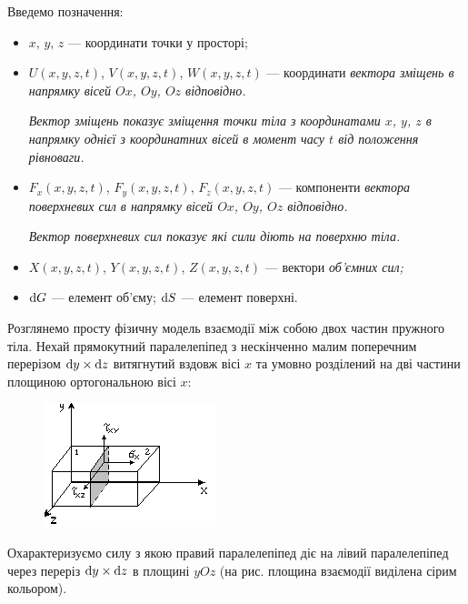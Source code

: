 Введемо позначення:
\begin{itemize}
	\item $x$, $y$, $z$ --- координати точки у просторі;
 	\item $U(x, y, z, t)$, $V(x, y, z, t)$, $W(x, y, z, t)$ --- координати \it{вектора зміщень} в напрямку вісей $Ox$, $Oy$, $Oz$ відповідно. \smallskip

 	\begin{remark}
 		\it{Вектор зміщень} показує зміщення точки тіла з координатами $x$, $y$, $z$ в напрямку однієї з координатних вісей в момент часу $t$ від положення рівноваги.
 	\end{remark}

	\item $F_x(x, y, z, t)$, $F_y(x, y, z, t)$, $F_z(x, y, z, t)$ --- компоненти \it{вектора поверхневих сил} в напрямку вісей $Ox$, $Oy$, $Oz$ відповідно. \smallskip

	\begin{remark}
		\it{Вектор поверхневих сил} показує які сили діють на поверхню тіла.
	\end{remark}

	\item $X(x, y, z, t)$, $Y(x, y, z, t)$, $Z(x, y, z, t)$ --- вектори \it{об'ємних сил};
	
	\item $\mathop{}\!\mathrm{d} G$ --- елемент об'єму; $\mathop{}\!\mathrm{d} S$ --- елемент поверхні.
\end{itemize}

Розглянемо просту фізичну модель взаємодії між собою двох частин пружного тіла. Нехай прямокутний паралелепіпед з нескінченно малим поперечним перерізом $\mathop{}\!\mathrm{d} y \times \mathop{}\!\mathrm{d} z$ витягнутий вздовж вісі $x$ та умовно розділений на дві частини площиною ортогональною вісі $x$:
\begin{figure}[H]
	\centering
	\includegraphics[]{img/8-1.png}
\end{figure}

Охарактеризуємо силу з якою правий паралелепіпед діє на лівий паралелепіпед через переріз $\mathop{}\!\mathrm{d} y \times \mathop{}\!\mathrm{d} z$ в площині $yOz$ (на рис. площина взаємодії виділена сірим кольором). \medskip


